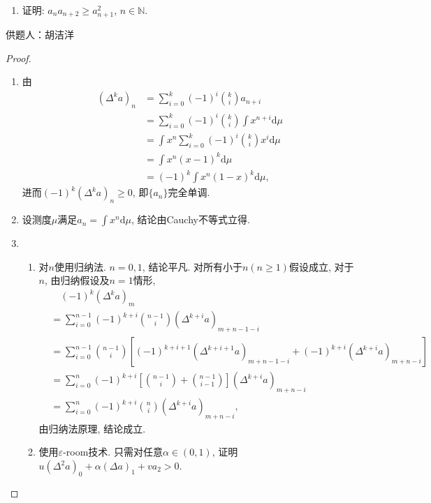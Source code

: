 \documentclass[lang=cn,12pt,a4paper]{elegantpaper}
\begin{document}
\begin{enumerate}
\begin{enumerate}
\begin{enumerate}[i]
			\item 证明: $a_na_{n+2}\geq a_{n+1}^2$, $n\in\mathbb N$.
		\end{enumerate}
	\end{enumerate}
	
	\begin{flushright}
		\kaishu
		供题人：胡洁洋
	\end{flushright}
	
	\begin{proof}
		\begin{enumerate}
		\item 由\[\begin{aligned}
			(\Delta^k a)_n&=\sum_{i=0}^{k}(-1)^{i}\binom{k}{i}a_{n+i}\\
			&=\sum_{i=0}^{k}(-1)^{i}\binom{k}{i}\int x^{n+i}\mathrm{d} \mu\\
			&=\int x^n\sum_{i=0}^{k}(-1)^i\binom{k}{i}x^i\mathrm{d}\mu\\
			&=\int x^n(x-1)^k\mathrm d\mu\\
			&=(-1)^k\int x^n(1-x)^k\mathrm d\mu,
		\end{aligned}\]进而$(-1)^k(\Delta^k a)_n\geq 0$, 即$\{a_n\}$完全单调.
		
		\item 设测度$\mu$满足$a_n=\int x^n \mathrm{d}\mu$, 结论由Cauchy不等式立得.
		
		\item
			\begin{enumerate}[i]
				\item 对$n$使用归纳法. $n=0,1$, 结论平凡. 对所有小于$n(n\geq 1)$假设成立, 对于$n$, 由归纳假设及$n=1$情形,
					\[\begin{aligned}
						&\quad(-1)^k(\Delta^ka)_m \\
						&=\sum\limits_{i=0}^{n-1}(-1)^{k+i}\binom{n-1}{i}(\Delta ^{k+i}a)_{m+n-1-i}\\
						&=\sum\limits_{i=0}^{n-1}\binom{n-1}{i} [(-1)^{k+i+1}(\Delta^{k+i+1}a)_{m+n-1-i}+(-1)^{k+i}(\Delta^{k+i}a)_{m+n-i}]\\&=\sum\limits_{i=0}^{n}(-1)^{k+i}[\binom{n-1}{i}+\binom{n-1}{i-1}](\Delta ^{k+i}a)_{m+n-i}\\
						&=\sum\limits_{i=0}^{n}(-1)^{k+i}\binom{n}{i}(\Delta ^{k+i}a)_{m+n-i},
					\end{aligned}\]
					由归纳法原理, 结论成立.

				\item 使用$\varepsilon$-room技术. 只需对任意$\alpha\in(0,1)$, 证明$u(\Delta^2 a)_0+\alpha(\Delta a)_1+va_2>0$.


\end{enumerate}
\end{enumerate}
\end{proof}
\end{enumerate}
\end{document}
